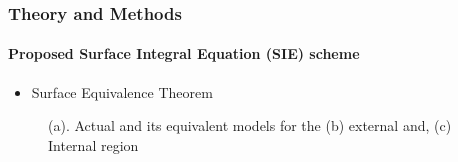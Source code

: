 \documentclass[mathserif,16pt,xcolor=table]{beamer}
\begin{document}
      \begin{frame}
        \frametitle{Theory and Methods}
        \framesubtitle{Proposed Surface Integral Equation (SIE) scheme}

        \begin{itemize}
          \item{Surface Equivalence Theorem}
        \end{itemize}
        \begin{figure}
          \centering
          \def\svgwidth{1\linewidth}
          
          \caption{(a). Actual and its equivalent models for the (b) external and, (c) Internal region }
        \end{figure}
      \end{frame}
\end{document}
